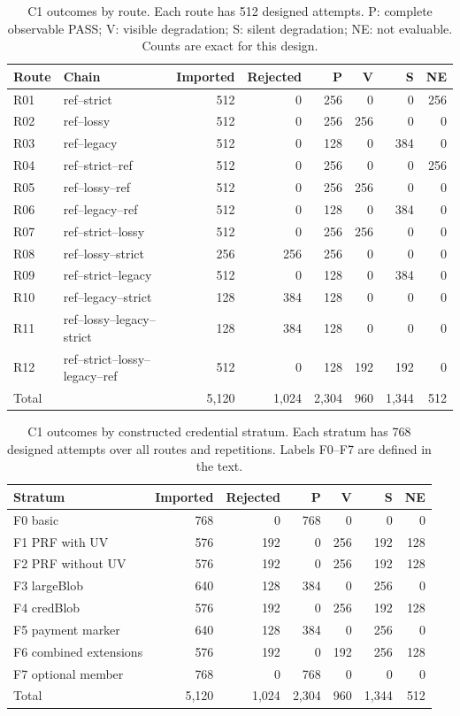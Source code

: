 \documentclass[letterpaper,twocolumn,10pt]{article}
\begin{document}
\begin{table}[t]
\centering
\caption{C1 outcomes by route. Each route has 512 designed attempts.
P: complete observable PASS; V: visible degradation; S: silent
degradation; NE: not evaluable. Counts are exact for this design.}
\label{tab:routes}
\begin{tabular}{llrrrrrr}
\toprule
Route & Chain & Imported & Rejected & P & V & S & NE \\
\midrule
R01 & ref--strict & 512 & 0 & 256 & 0 & 0 & 256 \\
R02 & ref--lossy & 512 & 0 & 256 & 256 & 0 & 0 \\
R03 & ref--legacy & 512 & 0 & 128 & 0 & 384 & 0 \\
R04 & ref--strict--ref & 512 & 0 & 256 & 0 & 0 & 256 \\
R05 & ref--lossy--ref & 512 & 0 & 256 & 256 & 0 & 0 \\
R06 & ref--legacy--ref & 512 & 0 & 128 & 0 & 384 & 0 \\
R07 & ref--strict--lossy & 512 & 0 & 256 & 256 & 0 & 0 \\
R08 & ref--lossy--strict & 256 & 256 & 256 & 0 & 0 & 0 \\
R09 & ref--strict--legacy & 512 & 0 & 128 & 0 & 384 & 0 \\
R10 & ref--legacy--strict & 128 & 384 & 128 & 0 & 0 & 0 \\
R11 & ref--lossy--legacy--strict & 128 & 384 & 128 & 0 & 0 & 0 \\
R12 & ref--strict--lossy--legacy--ref & 512 & 0 & 128 & 192 & 192 & 0 \\
\midrule
Total & & 5,120 & 1,024 & 2,304 & 960 & 1,344 & 512 \\
\bottomrule
\end{tabular}
\end{table}

\begin{table}[t]
\centering
\caption{C1 outcomes by constructed credential stratum.
Each stratum has 768 designed attempts over all routes and repetitions.
Labels F0--F7 are defined in the text.}
\label{tab:strata}
\begin{tabular}{lrrrrrr}
\toprule
Stratum & Imported & Rejected & P & V & S & NE \\
\midrule
F0 basic & 768 & 0 & 768 & 0 & 0 & 0 \\
F1 PRF with UV & 576 & 192 & 0 & 256 & 192 & 128 \\
F2 PRF without UV & 576 & 192 & 0 & 256 & 192 & 128 \\
F3 largeBlob & 640 & 128 & 384 & 0 & 256 & 0 \\
F4 credBlob & 576 & 192 & 0 & 256 & 192 & 128 \\
F5 payment marker & 640 & 128 & 384 & 0 & 256 & 0 \\
F6 combined extensions & 576 & 192 & 0 & 192 & 256 & 128 \\
F7 optional member & 768 & 0 & 768 & 0 & 0 & 0 \\
\midrule
Total & 5,120 & 1,024 & 2,304 & 960 & 1,344 & 512 \\
\bottomrule
\end{tabular}
\end{table}
\end{document}
